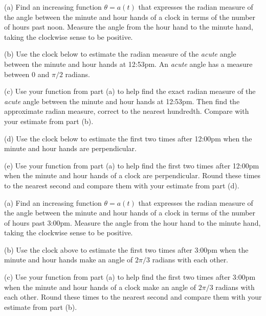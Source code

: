 \documentclass{ximera}
\begin{document}
\begin{question}   \label{Q54: Angles}
(a) Find an increasing function $\theta = a(t)$ that expresses the radian measure of the angle between the minute and hour hands of a clock in terms of the number of hours past noon. Measure the angle from the hour hand to the minute hand, taking the clockwise sense to be positive. %

(b) Use the clock below to estimate the radian measure of the \emph{acute} angle between the minute and hour hands at 12:53pm. An \emph{acute} angle has a measure between $0$ and $\pi/2$ radians.

(c) Use your function from part (a) to help find the exact radian measure of the \emph{acute} angle between the minute and hour hands at 12:53pm. Then find the approximate radian measure, correct to the nearest hundredth. Compare with your estimate from part (b).

(d) Use the clock below to estimate the first two times after 12:00pm when the minute and hour hands are perpendicular.

(e) Use your function from part (a) to help find the first two times after 12:00pm when the minute and hour hands of a clock are perpendicular. Round these times to the nearest second and compare them with your estimate from part (d).

 
\begin{onlineOnly}
    \begin{center}
\end{center}
\end{onlineOnly}

\end{question}


\begin{question}   \label{Q54B: Angles}
(a) Find an increasing function $\theta = a(t)$ that expresses the radian measure of the angle between the minute and hour hands of a clock in terms of the number of hours past 3:00pm. Measure the angle from the hour hand to the minute hand, taking the clockwise sense to be positive. %

(b) Use the clock above to estimate the first two times after 3:00pm when the minute and hour hands make an angle of $2\pi/3$ radians with each other.

(c) Use your function from part (a) to help find the first two times after 3:00pm when the minute and hour hands of a clock make an angle of $2\pi/3$ radians with each other. Round these times to the nearest second and compare them with your estimate from part (b).

\end{question}
\end{document}
